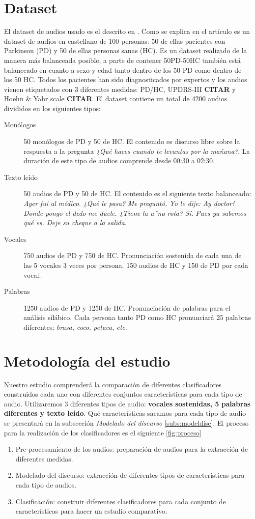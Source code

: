 \section{Dataset}
El dataset de audios usado es el descrito en \cite{OrzCorpus}. Como se explica en el artículo es un dataset de audios en castellano de 100 personas: 50 de ellas pacientes con Parkinson (PD) y 50 de ellas personas sanas (HC). Es un dataset realizado de la manera más balanceada posible, a parte de contener 50PD-50HC también está balanceado en cuanto a sexo y edad tanto dentro de los 50 PD como dentro de los 50 HC. Todos los pacientes han sido diagnosticados por expertos y los audios vienen etiquetados con 3 diferentes medidas: PD/HC, UPDRS-III \textbf{CITAR} y  Hoehn \& Yahr scale \textbf{CITAR}.
El dataset contiene un total de 4200 audios divididos en los siguientes tipos:
\begin{description}
	\item[Monólogos] 50 monólogos de PD y 50 de HC. El contenido es discurso libre sobre la respuesta a la pregunta \textit{¿Qué haces cuando te levantas por la mañana?}. La duración de este tipo de audios comprende desde 00:30 a 02:30.
	\item[Texto leído] 50 audios de PD y 50 de HC. El contenido es el siguiente texto balanceado: \textit{Ayer fui al médico. ¿Qué le pasa? Me preguntó. Yo le dije: Ay doctor! Donde pongo el dedo me duele. ¿Tiene la u˜na rota? Sí. Pues ya sabemos qué es. Deje su cheque a la salida.}
	\item[Vocales] 750 audios de PD y 750 de HC. Pronunciación sostenida de cada una de las 5 vocales 3 veces por persona. 150 audios de HC y 150 de PD por cada vocal.
	\item[Palabras] 1250 audios de PD y 1250 de HC. Pronunciación de palabras para el análisis silábico. Cada persona tanto PD como HC pronunciará 25 palabras diferentes: \textit{brasa, coco, petaca, etc}.
\end{description}

\section{Metodología del estudio}
Nuestro estudio comprenderá la comparación de diferentes clasificadores construidos cada uno con diferentes conjuntos características para cada tipo de audio. Utilizaremos 3 diferentes tipos de audio: \textbf{vocales sostenidas, 5 palabras diferentes y texto leído}. Qué características sacamos para cada tipo de audio se presentará en la subsección \textit{Modelado del discurso} \ref{subs:modeldisc}. El proceso para la realización de los clasificadores es el siguiente \ref{fig:proceso}
\begin{enumerate}
\item Pre-procesamiento de los audios: preparación de audios para la extracción de diferentes medidas.
\item Modelado del discurso: extracción de diferentes tipos de características para cada tipo de audios.
\item Clasificación: construir diferentes clasificadores para cada conjunto de características para hacer un estudio comparativo.
\end{enumerate}

